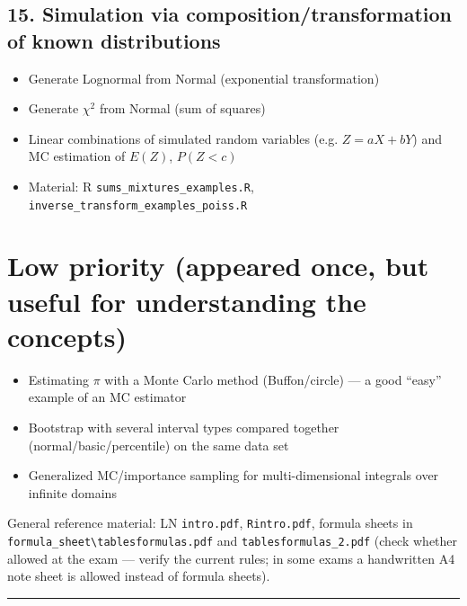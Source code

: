\documentclass[11pt]{article}
\begin{document}
\subsection*{15. Simulation via composition/transformation of known distributions}
\begin{itemize}[leftmargin=*]
  \item Generate Lognormal from Normal (exponential transformation)
  \item Generate $\chi^2$ from Normal (sum of squares)
  \item Linear combinations of simulated random variables (e.g. $Z = aX+bY$) and MC
  estimation of $E(Z)$, $P(Z<c)$
  \item Material: R \texttt{sums\_mixtures\_examples.R}, \texttt{inverse\_transform\_examples\_poiss.R}
\end{itemize}

\section*{\textcolor{prilowest}{Low priority (appeared once, but useful for understanding the concepts)}}

\begin{itemize}[leftmargin=*]
  \item Estimating $\pi$ with a Monte Carlo method (Buffon/circle) --- a good ``easy'' example
  of an MC estimator
  \item Bootstrap with several interval types compared together (normal/basic/percentile) on
  the same data set
  \item Generalized MC/importance sampling for multi-dimensional integrals over infinite domains
\end{itemize}

\bigskip
\noindent General reference material: LN \texttt{intro.pdf}, \texttt{Rintro.pdf}, formula
sheets in \texttt{formula\_sheet\textbackslash tablesformulas.pdf} and
\texttt{tablesformulas\_2.pdf} (check whether allowed at the exam --- verify the current
rules; in some exams a handwritten A4 note sheet is allowed instead of formula sheets).

\bigskip
\hrule
\bigskip
\end{document}
